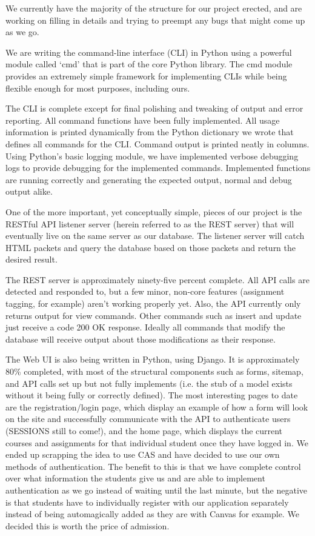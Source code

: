 \documentclass[10pt,draftclsnofoot,onecolumn]{IEEEtran}
\begin{document}
We currently have the majority of the structure for our project erected, and
are working on filling in details and trying to preempt any bugs that might
come up as we go.

We are writing the command-line interface (CLI) in Python using a powerful
module called ‘cmd’ that is part of the core Python library. The cmd module
provides an extremely simple framework for implementing CLIs while being
flexible enough for most purposes, including ours.

The CLI is complete except for final polishing and tweaking of output and error
reporting. All command functions have been fully implemented. All usage
information is printed dynamically from the Python dictionary we wrote that
defines all commands for the CLI. Command output is printed neatly in columns.
Using Python’s basic logging module, we have implemented verbose debugging logs
to provide debugging for the implemented commands. Implemented functions are
running correctly and generating the expected output, normal and debug output
alike.

One of the more important, yet conceptually simple, pieces of our project is
the RESTful API listener server (herein referred to as the REST server)  that
will eventually live on the same server as our database. The listener server
will catch HTML packets and query the database based on those packets and
return the desired result.

The REST server is approximately ninety-five percent complete. All API calls
are detected and responded to, but a few minor, non-core features (assignment
tagging, for example) aren’t working properly yet. Also, the API currently only
returns output for view commands. Other commands such as insert and update just
receive a code 200 OK response. Ideally all commands that modify the database
will receive output about those modifications as their response.

The Web UI is also being written in Python, using Django.  It is approximately
80\% completed, with most of the structural components such as forms, sitemap,
and API calls set up but not fully implements (i.e. the stub of a model exists
without it being fully or correctly defined).  The most interesting pages to
date are the registration/login page, which display an example of how a form
will look on the site and successfully communicate with the API to authenticate
users (SESSIONS still to come!), and the home page, which displays the current
courses and assignments for that individual student once they have logged in.
We ended up scrapping the idea to use CAS and have decided to use our own
methods of authentication.  The benefit to this is that we have complete
control over what information the students give us and are able to implement
authentication as we go instead of waiting until the last minute, but the
negative is that students have to individually register with our application
separately instead of being automagically added as they are with Canvas for
example.  We decided this is worth the price of admission.  
\end{document}
